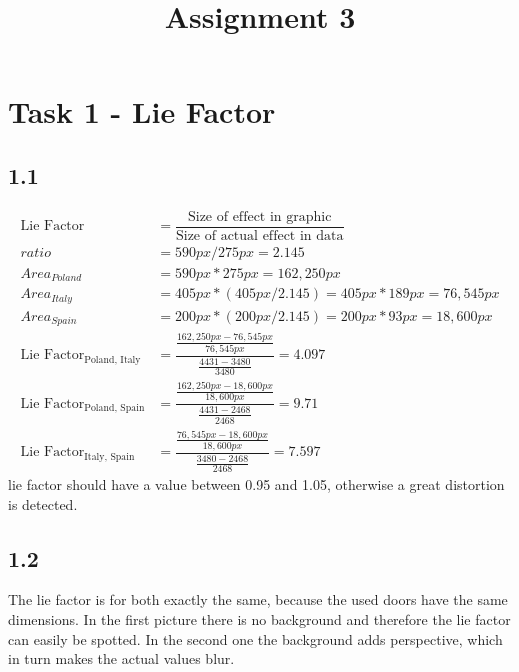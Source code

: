 \documentclass[a4paper]{article}
\date{}
\author{}
\title{\textbf{Assignment 3}}
\begin{document}
\maketitle 
\thispagestyle{fancy}

\section*{Task 1 - Lie Factor}
\subsection*{1.1}
\begin{align*}
\text{Lie Factor}&= \dfrac{\text{Size of effect in graphic}}{\text{Size of actual effect in data}}\\
ratio &= 590px / 275px = 2.145\\
Area_{Poland} &= 590px * 275px = 162,250px\\
Area_{Italy} &= 405px * (405px / 2.145) = 405px * 189px = 76,545px\\
Area_{Spain} &= 200px * (200px / 2.145) = 200px * 93px = 18,600px\\
\text{Lie Factor}_{\text{Poland, Italy}} &= \dfrac{\frac{162,250px - 76,545px}{76,545px}}{\frac{4431 - 3480}{3480}} = 4.097\\
\text{Lie Factor}_{\text{Poland, Spain}} &= \dfrac{\frac{162,250px - 18,600px}{18,600px}}{\frac{4431 - 2468}{2468}} = 9.71\\
\text{Lie Factor}_{\text{Italy, Spain}} &= \dfrac{\frac{76,545px - 18,600px}{18,600px}}{\frac{3480 - 2468}{2468}} = 7.597
\end{align*}
lie factor should have a value between 0.95 and 1.05, otherwise a great distortion is detected.

\subsection*{1.2}
The lie factor is for both exactly the same, because the used doors have the same dimensions. In the first picture there is no background and therefore the lie factor can easily be spotted. In the second one the background adds perspective, which in turn makes the actual values blur.
\end{document}
